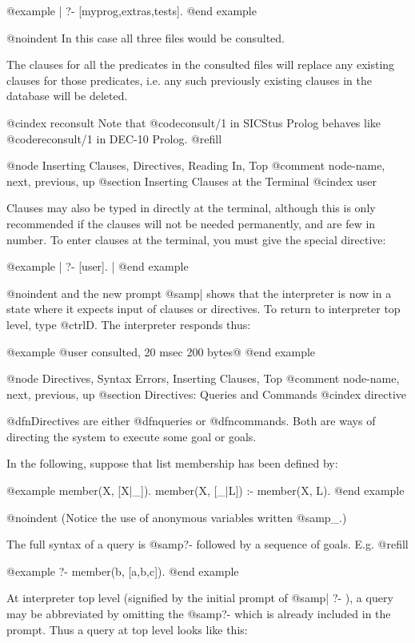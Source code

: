 @example
| ?- [myprog,extras,tests].
@end example

@noindent
In this case all three files would be consulted.

The clauses for all the predicates in the consulted files will replace any
existing clauses for those predicates, i.e. any such previously existing
clauses in the database will be deleted.

@cindex reconsult
Note that @code{consult/1} in SICStus Prolog behaves like @code{reconsult/1}
in DEC-10 Prolog. @refill

@node Inserting Clauses, Directives, Reading In, Top
@comment  node-name,  next,  previous,  up
@section Inserting Clauses at the Terminal
@cindex user

Clauses may also be typed in directly at the terminal, although this is
only recommended if the clauses will not be needed permanently, and are few
in number.  To enter clauses at the terminal, you must give the special
directive:

@example
| ?- [user].
|
@end example

@noindent
and the new prompt @samp{| } shows that the interpreter is now in a state where
it expects input of clauses or directives.  To return to interpreter top
level, type @ctrl{D}.  The interpreter responds thus:

@example
@{user consulted, 20 msec 200 bytes@}
@end example

@node Directives, Syntax Errors, Inserting Clauses, Top
@comment  node-name,  next,  previous,  up
@section Directives:  Queries and Commands
@cindex directive

@dfn{Directives} are either @dfn{queries} or @dfn{commands}.  Both are
ways of directing the system to execute some goal or goals.

In the following, suppose that list membership has been defined by:

@example
member(X, [X|_]).
member(X, [_|L]) :- member(X, L).
@end example

@noindent
(Notice the use of anonymous variables written @samp{_}.)

The full syntax of a query is @samp{?-} followed by a sequence of goals.
E.g. @refill

@example
?- member(b, [a,b,c]).
@end example

At interpreter top level (signified by the initial prompt of @samp{| ?- }), a
query may be abbreviated by omitting the @samp{?-} which is already included
in the prompt.  Thus a query at top level looks like this:

